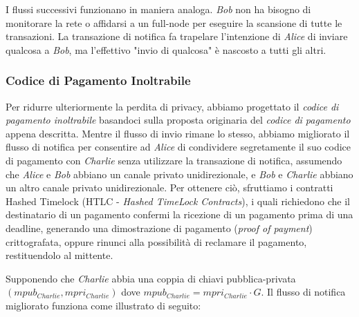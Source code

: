 I flussi successivi funzionano in maniera analoga.
\emph{Bob} non ha bisogno di monitorare la rete o affidarsi a un full-node per eseguire la scansione di tutte le transazioni. La transazione di notifica fa trapelare l'intenzione di \emph{Alice} di inviare qualcosa a \emph{Bob}, ma l'effettivo "invio di qualcosa" è nascosto a tutti gli altri.

\subsubsection{Codice di Pagamento Inoltrabile}
Per ridurre ulteriormente la perdita di privacy, abbiamo progettato il \emph{codice di pagamento inoltrabile} basandoci sulla proposta originaria del \emph{codice di pagamento} appena descritta. Mentre il flusso di invio rimane lo stesso, abbiamo migliorato il flusso di notifica per consentire ad \emph{Alice} di condividere segretamente il suo codice di pagamento con \emph{Charlie} senza utilizzare la transazione di notifica, assumendo che \emph{Alice} e \emph{Bob} abbiano un canale privato unidirezionale, e \emph{Bob} e \emph{Charlie} abbiano un altro canale privato unidirezionale. Per ottenere ciò, sfruttiamo i contratti Hashed Timelock (HTLC - \emph{Hashed TimeLock Contracts}), i quali richiedono che il destinatario di un pagamento confermi la ricezione di un pagamento prima di una deadline, generando una dimostrazione di pagamento (\emph{proof of payment}) crittografata, oppure rinunci alla possibilità di reclamare il pagamento, restituendolo al mittente.


Supponendo che \emph{Charlie} abbia una coppia di chiavi pubblica-privata $(mpub_{Charlie}, mpri_{Charlie})$ dove $mpub_{Charlie} = mpri_{Charlie}\cdot G$. Il flusso di notifica migliorato funziona come illustrato di seguito:

